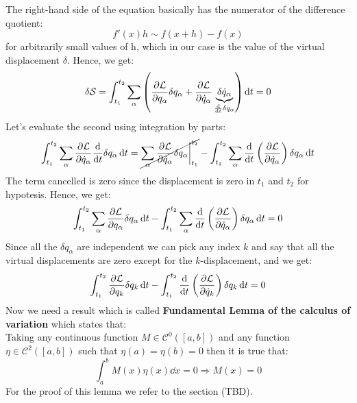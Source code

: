 The right-hand side of the equation basically has the numerator of the difference quotient:
\begin{equation}
    f'(x)h \sim f(x+h) - f(x)
\end{equation}
for arbitrarily small values of h, which in our case is the value of the virtual displacement $\delta$. Hence, we get:
\begin{equation}
    \delta \action = \int_{t_1}^{t_2}\bigsum_{\alpha}\brackets{\pdv{\lagr}{q_{\alpha}}\delta q_{\alpha} + \pdv{\lagr}{\dot{q}_{\alpha}} \underbrace{\delta \dot{q}_{\alpha}}_{\frac{\dd{}}{\dd{t}}\delta q_{\alpha}}} \dd{t} = 0
\end{equation}
Let's evaluate the second using integration by parts:
\begin{equation}
    \int_{t_1}^{t_2}\bigsum_{\alpha}\pdv{\lagr}{\dot{q}_{\alpha}} \dv{}{t}\delta q_{\alpha} \dd{t} = \cancel{\bigsum_{\alpha}\pdv{\lagr}{\dot{q}_{\alpha}} \delta q_{\alpha}\bigg|_{t_1}^{t_2}} - \int_{t_1}^{t_2}\bigsum_{\alpha}\dv{}{t}\brackets{\pdv{\lagr}{\dot{q}_{\alpha}}} \delta q_{\alpha} \dd{t}
\end{equation}
The term cancelled is zero since the displacement is zero in $t_1$ and $t_2$ for hypotesis. Hence, we get:
\begin{equation}
    \int_{t_1}^{t_2}\bigsum_{\alpha}\pdv{\lagr}{q_{\alpha}}\delta q_{\alpha} \dd{t} - \int_{t_1}^{t_2}\bigsum_{\alpha}\dv{}{t}\brackets{\pdv{\lagr}{\dot{q}_{\alpha}}} \delta q_{\alpha} \dd{t} = 0
\end{equation}
Since all the $\delta q_{\alpha}$ are independent we can pick any index $k$ and say that all the virtual displacements are zero except for the $k$-displacement, and we get:
\begin{equation}
    \int_{t_1}^{t_2}\dfrac{\partial \lagr}{\partial q_{k}}\delta q_{k} \dd{t} - \int_{t_1}^{t_2}\dv{}{t}\brackets{\dfrac{\partial \lagr}{\partial \dot{q}_{k}}} \delta q_{k} \dd{t} = 0
\end{equation}
Now we need a result which is called \textbf{Fundamental Lemma of the calculus of variation} which states that:\\
Taking any continuous function $M\in\mathcal{C}^0([a,b])$ and any function $\eta \in \mathcal{C}^2([a,b])$ such that $\eta(a) = \eta(b) = 0$ then it is true that:
\begin{equation} \label{e:Fundamental_lemma_variation_calculus}
    \int_{a}^{b}M(x)\eta(x)\dd{x} = 0 \Rightarrow M(x) = 0
\end{equation}
For the proof of this lemma we refer to the section (TBD).\\
